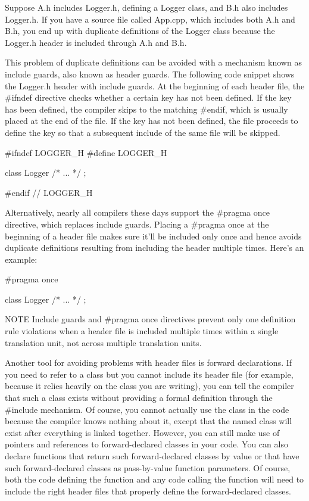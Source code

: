 
Suppose A.h includes Logger.h, defining a Logger class, and B.h also includes Logger.h. If you have a source file called App.cpp, which includes both A.h and B.h, you end up with duplicate definitions of the Logger class because the Logger.h header is included through A.h and B.h.

This problem of duplicate definitions can be avoided with a mechanism known as include guards, also known as header guards. The following code snippet shows the Logger.h header with include guards. At the beginning of each header file, the \#ifndef directive checks whether a certain key has not been defined. If the key has been defined, the compiler skips to the matching \#endif, which is usually placed at the end of the file. If the key has not been defined, the file proceeds to define the key so that a subsequent include of the same file will be skipped.

\begin{cpp}
#ifndef LOGGER_H
#define LOGGER_H

class Logger { /* ... */ };

#endif // LOGGER_H
\end{cpp}

Alternatively, nearly all compilers these days support the \#pragma once directive, which replaces include guards. Placing a \#pragma once at the beginning of a header file makes sure it’ll be included only once and hence avoids duplicate definitions resulting from including the header multiple times. Here’s an example:

\begin{cpp}
#pragma once

class Logger { /* ... */ };
\end{cpp}

\begin{myNotic}{NOTE}
Include guards and \#pragma once directives prevent only one definition rule violations when a header file is included multiple times within a single translation unit, not across multiple translation units.
\end{myNotic}


Another tool for avoiding problems with header files is forward declarations. If you need to refer to a class but you cannot include its header file (for example, because it relies heavily on the class you are writing), you can tell the compiler that such a class exists without providing a formal definition through the \#include mechanism. Of course, you cannot actually use the class in the code because the compiler knows nothing about it, except that the named class will exist after everything is linked together. However, you can still make use of pointers and references to forward-declared classes in your code. You can also declare functions that return such forward-declared classes by value or that have such forward-declared classes as pass-by-value function parameters. Of course, both the code defining the function and any code calling the function will need to include the right header files that properly define the forward-declared classes.

